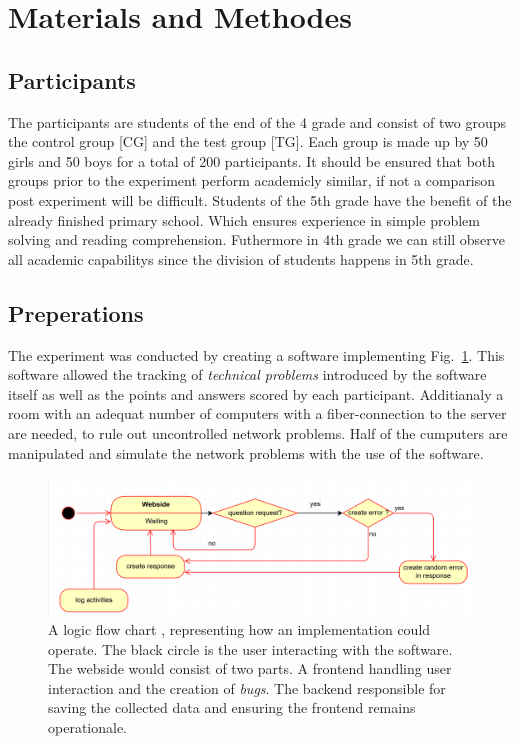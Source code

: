 \documentclass[runningheads]{llncs}
\begin{document}
\section{Materials and Methodes}
\subsection{Participants}
The participants are students of the end of the 4 grade and consist of two groups the control group [CG] and
the test group [TG]. Each group is made up by 50 girls and 50 boys for a total of 200 participants.
It should be ensured that both groups prior to the experiment perform academicly similar, if not a
comparison post experiment will be difficult. Students of the 5th grade have the benefit of the
already finished primary school. Which ensures experience in simple problem solving and
reading comprehension. Futhermore in 4th grade we can still observe all academic capabilitys
since the division of students happens in 5th grade.


\subsection{Preperations}
The experiment was conducted by creating a software implementing Fig.~\ref{fig1}.
This software allowed the tracking of {\itshape technical problems} introduced by
the software itself as well as the points and answers scored by each participant.
Additianaly a room with an adequat number of computers with a fiber-connection
to the server are needed, to rule out uncontrolled network problems.
Half of the cumputers are manipulated and simulate the network problems with the
use of the software.

\begin{figure}
    \includegraphics[width=\textwidth]{UML Prototyp.PNG}
    \caption{A logic flow chart , representing how an implementation could operate.
    The black circle is the user interacting with the software. The webside would
    consist of two parts. A frontend handling user interaction and the creation of {\itshape bugs}.
    The backend responsible for saving the collected data and ensuring the frontend
    remains operationale.} \label{fig1}
\end{figure}
\end{document}

